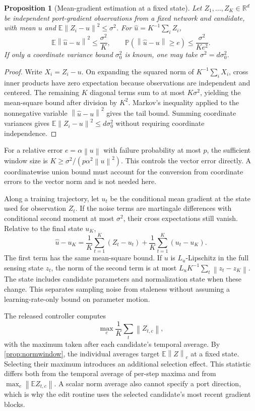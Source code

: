 \documentclass[10pt]{article}
\theoremstyle{paper}
\newtheorem{proposition}[theorem]{Proposition}
\newcommand{\R}{\mathbb R}
\newcommand{\E}{\mathbb E}
\newcommand{\Prob}{\mathbb P}
\newcommand{\norm}[1]{\left\lVert #1\right\rVert}
\begin{document}
\begin{proposition}[Mean-gradient estimation at a fixed state]
\label{prop:estimate}
Let $Z_1,\ldots,Z_K\in\R^d$ be independent port-gradient observations from a fixed network and candidate, with mean $u$ and $\E\norm{Z_i-u}^2\le\sigma^2$. For $\widehat u=K^{-1}\sum_iZ_i$,
\[
\E\norm{\widehat u-u}^2\le\frac{\sigma^2}K,
\qquad
\Prob(\norm{\widehat u-u}\ge e)\le\frac{\sigma^2}{Ke^2}.
\]
If only a coordinate variance bound $\sigma_0^2$ is known, one may take $\sigma^2=d\sigma_0^2$.
\end{proposition}
\begin{proof}
Write $X_i=Z_i-u$. On expanding the squared norm of $K^{-1}\sum_iX_i$, cross inner products have zero expectation because observations are independent and centered. The remaining $K$ diagonal terms sum to at most $K\sigma^2$, yielding the mean-square bound after division by $K^2$. Markov's inequality applied to the nonnegative variable $\norm{\widehat u-u}^2$ gives the tail bound. Summing coordinate variances gives $\E\norm{Z_i-u}^2\le d\sigma_0^2$ without requiring coordinate independence.
\end{proof}

For a relative error $e=\alpha\norm u$ with failure probability at most $p$, the sufficient window size is $K\ge\sigma^2/(p\alpha^2\norm u^2)$. This controls the vector error directly. A coordinatewise union bound must account for the conversion from coordinate errors to the vector norm and is not needed here.

Along a training trajectory, let $u_t$ be the conditional mean gradient at the state used for observation $Z_t$. If the noise terms are martingale differences with conditional second moment at most $\sigma^2$, their cross expectations still vanish. Relative to the final state $u_K$,
\[
\widehat u-u_K=\frac1K\sum_{t=1}^K(Z_t-u_t)
+\frac1K\sum_{t=1}^K(u_t-u_K).
\]
The first term has the same mean-square bound. If $u$ is $L_u$-Lipschitz in the full sensing state $z_t$, the norm of the second term is at most $L_uK^{-1}\sum_t\norm{z_t-z_K}$. The state includes candidate parameters and normalization state when these change. This separates sampling noise from staleness without assuming a learning-rate-only bound on parameter motion.

The released controller computes
\[
\max_c\frac1K\sum_t\norm{Z_{t,c}},
\]
with the maximum taken after each candidate's temporal average. By \cref{prop:normwindow}, the individual averages target $\E\norm Z_c$ at a fixed state. Selecting their maximum introduces an additional selection effect. This statistic differs both from the temporal average of per-step maxima and from $\max_c\norm{\E Z_{t,c}}$. A scalar norm average also cannot specify a port direction, which is why the edit routine uses the selected candidate's most recent gradient blocks.
\end{document}
